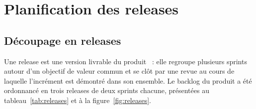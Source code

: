 \section{Planification des releases}
\label{sec:planification}

\subsection{Découpage en releases}

Une release est une version livrable du produit~\cite{cohn2005} : elle regroupe plusieurs
sprints autour d'un objectif de valeur commun et se clôt par une revue au cours de laquelle l'incrément est
démontré dans son ensemble. Le backlog du produit a été ordonnancé en trois releases de deux
sprints chacune, présentées au tableau~\ref{tab:releases} et à la figure~\ref{fig:releases}.

